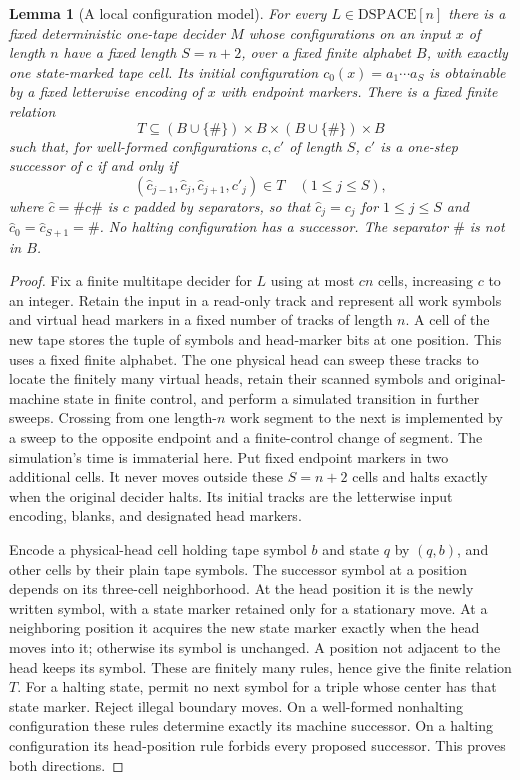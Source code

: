 \documentclass[11pt]{article}
\newtheorem{lemma}[theorem]{Lemma}
\theoremstyle{definition}
\theoremstyle{remark}
\begin{document}
\begin{lemma}[A local configuration model]
\label{lem:regex-local-machine}
For every $L\in\mathrm{DSPACE}[n]$ there is a fixed deterministic
one-tape decider $M$ whose configurations on an input $x$ of length $n$
have a fixed length $S=n+2$, over a fixed finite alphabet $B$, with
exactly one state-marked tape cell. Its initial configuration
$c_0(x)=a_1\cdots a_S$ is obtainable by a fixed letterwise encoding of
$x$ with endpoint markers. There is a fixed finite relation
\[
 T\subseteq (B\cup\{\#\})\times B\times
                  (B\cup\{\#\})\times B
\]
such that, for well-formed configurations $c,c'$ of length $S$, $c'$ is
a one-step successor of $c$ if and only if
\[
 (\hat c_{j-1},\hat c_j,\hat c_{j+1},c'_j)\in T\quad(1\leq j\leq S),
\]
where $\hat c=\#c\#$ is $c$ padded by separators, so that
$\hat c_j=c_j$ for $1\le j\le S$ and $\hat c_0=\hat c_{S+1}=\#$.
No halting configuration has a successor. The separator $\#$ is not
in $B$.
\end{lemma}
\begin{proof}
Fix a finite multitape decider for $L$ using at most $cn$ cells, increasing
$c$ to an integer. Retain the input in a read-only track and represent
all work symbols and virtual head markers in a fixed number of tracks
of length $n$. A cell of the new tape stores the tuple of symbols and
head-marker bits at one position. This uses a fixed finite alphabet.
The one physical head can sweep these tracks to locate the finitely many
virtual heads, retain their scanned symbols and original-machine state
in finite control, and perform a simulated transition in further sweeps.
Crossing from one length-$n$ work segment to the next is implemented
by a sweep to the opposite endpoint and a finite-control change of
segment. The simulation's time is immaterial here. Put fixed endpoint
markers in two additional cells. It never moves outside these $S=n+2$
cells and halts exactly when the original decider halts. Its initial
tracks are the letterwise input encoding, blanks, and designated head
markers.

Encode a physical-head cell holding tape symbol $b$ and state $q$ by
$(q,b)$, and other cells by their plain tape symbols. The successor
symbol at a position depends on its three-cell neighborhood. At the
head position it is the newly written symbol, with a state marker
retained only for a stationary move. At a neighboring position it
acquires the new state marker exactly when the head moves into it;
otherwise its symbol is unchanged. A position not adjacent to the head
keeps its symbol. These are finitely many rules, hence give the finite
relation $T$. For a halting state, permit no next symbol for a triple
whose center has that state marker. Reject illegal boundary moves.
On a well-formed nonhalting configuration these rules determine exactly
its machine successor. On a halting configuration its head-position
rule forbids every proposed successor. This proves both directions.
\end{proof}
\end{document}
